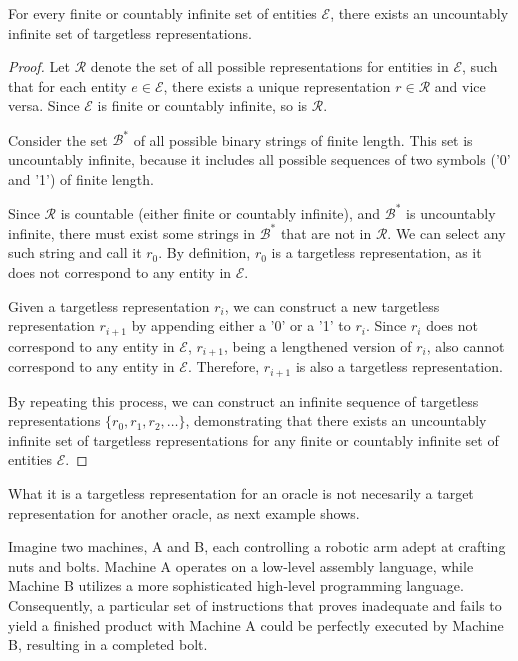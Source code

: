 \begin{proposition}
For every finite or countably infinite set of entities $\mathcal{E}$, there exists an uncountably infinite set of targetless representations.
\end{proposition}
\begin{proof}
Let $\mathcal{R}$ denote the set of all possible representations for entities in $\mathcal{E}$, such that for each entity $e \in \mathcal{E}$, there exists a unique representation $r \in \mathcal{R}$ and vice versa. Since $\mathcal{E}$ is finite or countably infinite, so is $\mathcal{R}$.

Consider the set $\mathcal{B}^\ast$ of all possible binary strings of finite length. This set is uncountably infinite, because it includes all possible sequences of two symbols ('0' and '1') of finite length.

Since $\mathcal{R}$ is countable (either finite or countably infinite), and $\mathcal{B}^\ast$ is uncountably infinite, there must exist some strings in $\mathcal{B}^\ast$ that are not in $\mathcal{R}$. We can select any such string and call it $r_0$. By definition, $r_0$ is a targetless representation, as it does not correspond to any entity in $\mathcal{E}$.

Given a targetless representation $r_i$, we can construct a new targetless representation $r_{i+1}$ by appending either a '0' or a '1' to $r_i$. Since $r_i$ does not correspond to any entity in $\mathcal{E}$, $r_{i+1}$, being a lengthened version of $r_i$, also cannot correspond to any entity in $\mathcal{E}$. Therefore, $r_{i+1}$ is also a targetless representation.

By repeating this process, we can construct an infinite sequence of targetless representations $\{r_0, r_1, r_2, \ldots\}$, demonstrating that there exists an uncountably infinite set of targetless representations for any finite or countably infinite set of entities $\mathcal{E}$. 
\end{proof}

What it is a targetless representation for an oracle is not necesarily a target representation for another oracle, as next example shows.

\begin{example}
Imagine two machines, A and B, each controlling a robotic arm adept at crafting nuts and bolts. Machine A operates on a low-level assembly language, while Machine B utilizes a more sophisticated high-level programming language. Consequently, a particular set of instructions that proves inadequate and fails to yield a finished product with Machine A could be perfectly executed by Machine B, resulting in a completed bolt.
\end{example}

